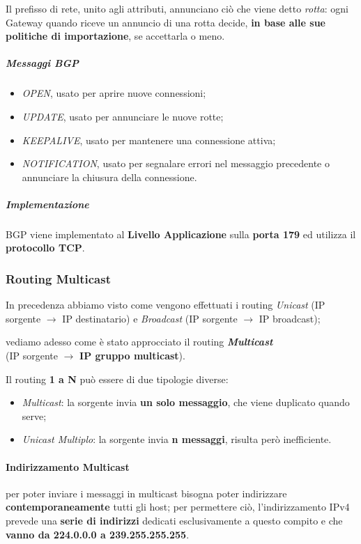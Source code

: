 \documentclass[a4paper]{article}
\begin{document}
					Il prefisso di rete, unito agli attributi, annunciano ciò che viene detto \emph{rotta}: ogni Gateway quando riceve un annuncio di una rotta decide, \textbf{in base alle sue politiche di importazione}, se accettarla o meno.
					
				\subparagraph{Messaggi BGP}
					\begin{itemize}
						\item \emph{OPEN}, usato per aprire nuove connessioni;
						\item \emph{UPDATE}, usato per annunciare le nuove rotte;
						\item \emph{KEEPALIVE}, usato per mantenere una connessione attiva;
						\item \emph{NOTIFICATION}, usato per segnalare errori nel messaggio precedente o annunciare la chiusura della connessione.
					\end{itemize}								 
					
				\subparagraph{Implementazione}
					BGP viene implementato al \textbf{Livello Applicazione} sulla \textbf{porta 179} ed utilizza il \textbf{protocollo TCP}.
					
			
		\subsubsection{Routing Multicast}
		
			In precedenza abbiamo visto come vengono effettuati i routing \emph{Unicast} (IP sorgente $ \rightarrow $ IP destinatario) e \emph{Broadcast} (IP sorgente $ \rightarrow $ IP broadcast); 
			
			vediamo adesso come è stato approcciato il routing \textbf{\emph{Multicast}} \\ (IP sorgente $ \rightarrow $ \textbf{IP gruppo multicast}).
			
			Il routing \textbf{1 a N} può essere di due tipologie diverse:
			\begin{itemize}
				\item \emph{Multicast}: la sorgente invia \textbf{un solo messaggio}, che viene duplicato quando serve;
				\item \emph{Unicast Multiplo}: la sorgente invia \textbf{n messaggi}, risulta però inefficiente.
			\end{itemize}						
			
			\paragraph{Indirizzamento Multicast}
			\label{par:multicastAddress}
				per poter inviare i messaggi in multicast bisogna poter indirizzare \textbf{contemporaneamente} tutti gli host; per permettere ciò, l'indirizzamento IPv4 prevede una \textbf{serie di indirizzi} dedicati esclusivamente a questo compito e che \textbf{vanno da 224.0.0.0 a 239.255.255.255}.
				
\end{document}
